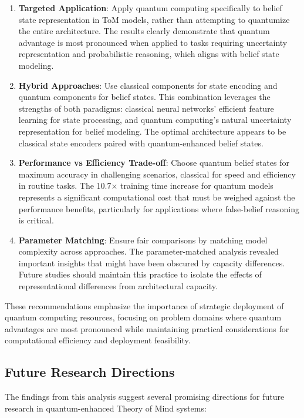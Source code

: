\documentclass[11pt]{article}
\begin{document}
\begin{enumerate}
    \item \textbf{Targeted Application}: Apply quantum computing specifically to belief state representation in ToM models, rather than attempting to quantumize the entire architecture. The results clearly demonstrate that quantum advantage is most pronounced when applied to tasks requiring uncertainty representation and probabilistic reasoning, which aligns with belief state modeling.
    \item \textbf{Hybrid Approaches}: Use classical components for state encoding and quantum components for belief states. This combination leverages the strengths of both paradigms: classical neural networks' efficient feature learning for state processing, and quantum computing's natural uncertainty representation for belief modeling. The optimal architecture appears to be classical state encoders paired with quantum-enhanced belief states.
    \item \textbf{Performance vs Efficiency Trade-off}: Choose quantum belief states for maximum accuracy in challenging scenarios, classical for speed and efficiency in routine tasks. The 10.7× training time increase for quantum models represents a significant computational cost that must be weighed against the performance benefits, particularly for applications where false-belief reasoning is critical.
    \item \textbf{Parameter Matching}: Ensure fair comparisons by matching model complexity across approaches. The parameter-matched analysis revealed important insights that might have been obscured by capacity differences. Future studies should maintain this practice to isolate the effects of representational differences from architectural capacity.
\end{enumerate}

These recommendations emphasize the importance of strategic deployment of quantum computing resources, focusing on problem domains where quantum advantages are most pronounced while maintaining practical considerations for computational efficiency and deployment feasibility.

\subsection{Future Research Directions}

The findings from this analysis suggest several promising directions for future research in quantum-enhanced Theory of Mind systems:
\end{document}
